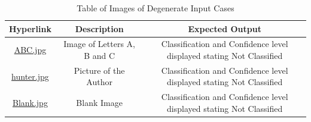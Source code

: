 \documentclass[12pt, titlepage]{article}
\begin{document}
\begin{landscape}
  \begin{table}[h!]
    \centering
    \begin{tabular}{|c|c|c|}
      \hline
      \textbf{Hyperlink} & \textbf{Description} & \textbf{Expected Output} \\ \hline
      \href{https://github.com/cer-hunter/OAR-CAS741/tree/main/tests/test-images/ABC.jpg}{ABC.jpg} & Image of Letters A, B and C& Classification and Confidence level displayed stating Not Classified\\ \hline
      \href{https://github.com/cer-hunter/OAR-CAS741/tree/main/tests/test-images/hunter_ok.jpg}{hunter.jpg} & Picture of the Author & Classification and Confidence level displayed stating Not Classified \\ \hline
      \href{https://github.com/cer-hunter/OAR-CAS741/tree/main/tests/test-images/Blank.jpg}{Blank.jpg} & Blank Image & Classification and Confidence level displayed stating Not Classified \\ \hline
    \end{tabular}
    \caption{Table of Images of Degenerate Input Cases}
    \label{table_degen}
  \end{table}


\end{landscape}
\end{document}
